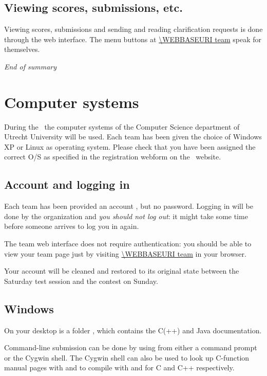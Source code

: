 \subsection*{Viewing scores, submissions, etc.}

Viewing scores, submissions and sending and reading clarification
requests is done through the web interface. The menu buttons at
\url{\WEBBASEURI team} speak for themselves.

\emph{End of summary}

\newpage

\section{Computer systems}

During the \NWERC\ the computer systems of the Computer Science
department of Utrecht University will be used. Each team has been
given the choice of Windows XP or Linux as operating system. Please
check that you have been assigned the correct O/S as specified in the
registration webform on the \NWERC\ website.

\subsection{Account and logging in}

Each team has been provided an account , but no password.
Logging in will be done by the organization and \emph{you should not
  log out}: it might take some time before someone arrives to log you
in again.

The \DOMjudge team web interface does not require authentication: you
should be able to view your team page just by visiting \url{\WEBBASEURI
  team} in your browser.

Your account will be cleaned and restored to its original state
between the Saturday test session and the contest on Sunday.

\subsection{Windows}

On your desktop is a folder , which contains the C(++) and
Java documentation.

Command-line submission can be done by using  from either a
command prompt or the Cygwin shell. The Cygwin shell can also be used to look
up C-function manual pages with  and to compile with
 and  for C and C++ respectively.

